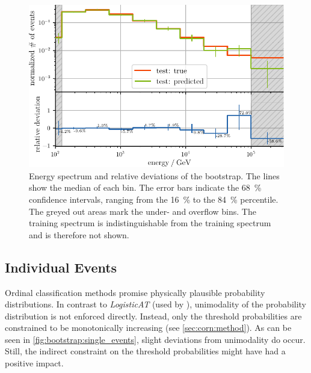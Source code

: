 \begin{figure}
  \centering
  \includegraphics[scale=1]{content/plots/bootstrap:spectrum_full.pdf}
  \caption{
    Energy spectrum and relative deviations of the bootstrap.
    The lines show the median of each bin.
    The error bars indicate the \SI{68}{\percent} confidence intervals,
    ranging from the \SI{16}{\percent} to the \SI{84}{\percent} percentile.
    The greyed out areas mark the under- and overflow bins.
    The training spectrum is indistinguishable from the training spectrum
      and is therefore not shown.
  }
  \label{fig:bootstrap:spectrum}
\end{figure}


\subsection{Individual Events}
Ordinal classification methods promise physically plausible probability distributions.
In contrast to \emph{LogisticAT}
    (used by \citeauthor{dsea_jan} \cite{dsea_jan}),
  unimodality of the probability distribution is not enforced directly.
Instead,
  only the threshold probabilities
  are constrained to be monotonically increasing
  (see \autoref{sec:corn:method}).
As can be seen in \autoref{fig:bootstrap:single_events},
  slight deviations from unimodality do occur.
Still,
  the indirect constraint on the threshold probabilities
  might have had a positive impact.

